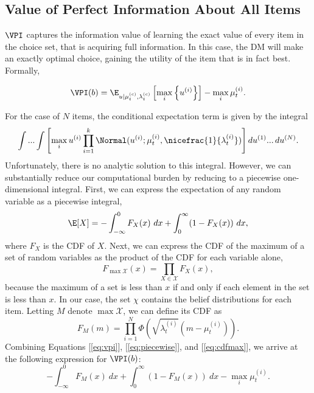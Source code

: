 \subsection{Value of Perfect Information About All Items}
$\VPI$ captures the information value of learning the exact value of every item in the choice set, that is acquiring full information. In this case, the DM will make an exactly optimal choice, gaining the utility of the item that is in fact best. Formally,

\begin{equation}
  \label{eq:vpi}
  \VPI(b)=\E_{u \mid \currentmean, \currentlam} \left[
    \max_{i}\left\{ u^{(i)}\right\}
  \right] -\max_{i}\mu_t^{(i)}.
\end{equation}
%

For the case of $N$ items, the conditional expectation term is given by the integral
%
\begin{equation*}
  \int...\int\left[\max_{i}u^{(i)}\prod_{i=1}^{k}\Normal(u^{(i)};\mu_t^{(i)},\nicefrac{1}{\lambda_t^{(i)}})\right]du^{(1)}...\,du^{(N)}.
\end{equation*}
%
Unfortunately, there is no analytic solution to this integral. However, we can substantially reduce our computational burden by reducing to a piecewise one-dimensional integral. First, we can express the expectation of any random variable as a piecewise integral,
%
\begin{equation}
  \label{eq:piecewise}
  \E[X]=-\int_{-\infty}^{0}F_{X}(x)\ dx+\int_{0}^{\infty}(1-F_{X}(x))\ dx,
\end{equation}
%
where $F_{X}$ is the CDF of $X$. Next, we can express the CDF of the maximum of a set of random variables as the product of the CDF for each variable alone,
%
\begin{equation}
  \label{eq:cdfmax}
  F_{\max\mathcal{X}}(x)=\prod_{X\in\mathcal{X}}F_{X}(x),
\end{equation}
%
because the maximum of a set is less than $x$ if and only if each element in the set is less than $x$. In our case, the set $\chi$ contains the belief distributions for each item.
Letting $M$ denote $\max \mathcal{X}$, we can define its CDF as
%
\begin{equation*}
  F_{M}(m)=\prod_{i=1}^{N}\Phi\left(\sqrt{\lambda_t^{(i)}}\left(m-\mu_t^{(i)}\right)\right).
\end{equation*}
%
Combining Equations [\ref{eq:vpi}], [\ref{eq:piecewise}], and [\ref{eq:cdfmax}], we arrive at the following expression for $\VPI(b)$:
%
\begin{equation*}
  -\int_{-\infty}^{0}F_{M}(x)\ dx 
  + \int_{0}^{\infty}(1-F_{M}(x))\ dx
  -\max_{i}\mu_t^{(i)}.
\end{equation*}

